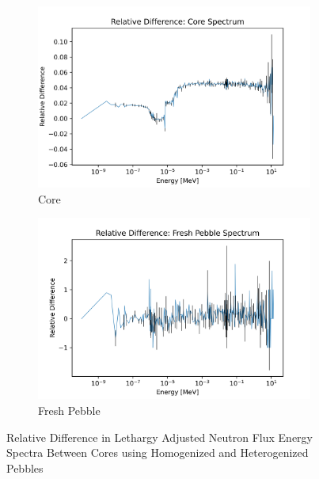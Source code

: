 \begin{figure}[H]
\centering
%
\begin{subfigure}{0.95\textwidth}
  \includegraphics[width=0.95\linewidth]{figures/reldiff_core_spec_er}
  \caption{Core}
  \label{fig:diff-core}
\end{subfigure}%


\begin{subfigure}{0.95\textwidth}
  \includegraphics[width=0.95\linewidth]{figures/reldiff_fresh_spec_er}
  \caption{Fresh Pebble}
  \label{fig:diff-fresh}
\end{subfigure}%

\caption{Relative Difference in Lethargy Adjusted Neutron Flux Energy Spectra Between Cores using Homogenized and Heterogenized Pebbles}
\end{figure}

